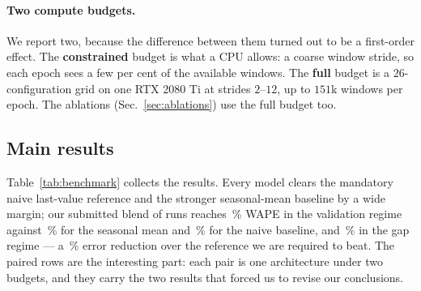 \documentclass[10pt,twocolumn]{article}
\begin{document}
\paragraph{Two compute budgets.} We report two, because the difference between them
turned out to be a first-order effect. The \textbf{constrained} budget is what a CPU
allows: a coarse window stride, so each epoch sees a few per cent of the available
windows. The \textbf{full} budget is a $26$-configuration grid on one RTX 2080 Ti at
strides $2$--$12$, up to $151$k windows per epoch. The ablations
(Sec.~\ref{sec:ablations}) use the full budget too.

\subsection{Main results}

\begin{table}[t]
\centering
\caption{Benchmark results on the held-out tails of \texttt{train.csv}; lower is
better, WAPE is the leaderboard's primary metric, and the test regime starts $336$
steps after the conditioning window. Each architecture appears twice, at the two
training budgets of Sec.~\ref{sec:protocol}; the parenthesised count is training
windows per epoch. $^{\ast}$ marks the variants that entered the shipped blend;
full six-metric tables are in \texttt{results/}.}
\label{tab:benchmark}
\scriptsize
\setlength{\tabcolsep}{1.8pt}

\end{table}

Table~\ref{tab:benchmark} collects the results. Every model clears the mandatory
naive last-value reference and the stronger seasonal-mean baseline by a wide
margin; our submitted blend of \ensMembers{} runs reaches \ensValWape\,\% WAPE in
the validation regime against \seasonalValWape\,\% for the seasonal mean and
\naiveValWape\,\% for the naive baseline, and \ensTestWape\,\% in the gap regime
--- a \ensVsNaive\,\% error reduction over the reference we are required to beat.
The paired rows are the interesting part: each pair is one architecture under two
budgets, and they carry the two results that forced us to revise our conclusions.
\end{document}
